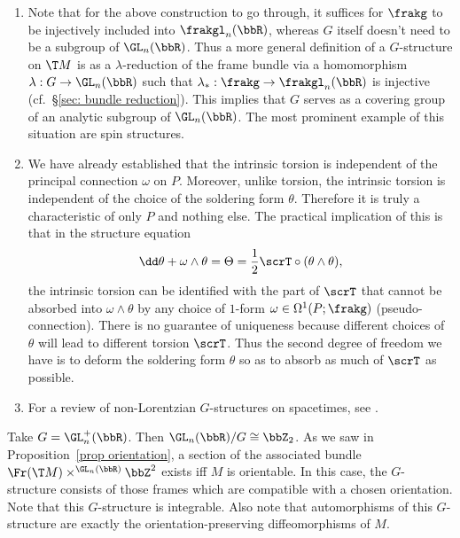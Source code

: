 \begin{rem}
    \begin{enumerate}
        \item Note that for the above construction to go through, it suffices for $\frakg$ to be injectively included into $\frakgl_n(\bbR)$, whereas $G$ itself doesn't need to be a subgroup of $\GL_n(\bbR)$. Thus a more general definition of a $G$-structure on $\T M$ is as a $\lambda$-reduction of the frame bundle via a homomorphism $\lambda:G\to \GL_n(\bbR)$ such that $\lambda_\ast:\frakg\to \frakgl_n(\bbR)$ is injective (cf.\ \S\ref{sec: bundle reduction}). This implies that $G$ serves as a covering group of an analytic subgroup of $\GL_n(\bbR)$. The most prominent example of this situation are spin structures.
        \item We have already established that the intrinsic torsion is independent of the principal connection $\omega$ on $P$. Moreover, unlike torsion, the intrinsic torsion is independent of the choice of the soldering form $\theta$. Therefore it is truly a characteristic of only $P$ and nothing else. The practical implication of this is that in the structure equation 
        \[\dd \theta+\omega\wedge\theta=\Theta=\frac12\scrT\circ (\theta\wedge\theta),\]
        the intrinsic torsion can be identified with the part of $\scrT$ that cannot be absorbed into $\omega\wedge\theta$ by any choice of $1$-form $\omega\in\Omega^1(P;\frakg)$ (pseudo-connection). There is no guarantee of uniqueness because different choices of $\theta$ will lead to different torsion $\scrT$. Thus the second degree of freedom we have is to deform the soldering form $\theta$ so as to absorb as much of $\scrT$ as possible. 
        \item For a review of non-Lorentzian $G$-structures on spacetimes, see \cite{OFarrill}.
    \end{enumerate}
\end{rem}


\begin{example}[Orientation]
    Take $G=\GL_n^+(\bbR)$. Then $\GL_n(\bbR)\slash G\cong \bbZ_2$. As we saw in Proposition~\ref{prop orientation}, a section of the associated bundle $\Fr(\T M)\times^{\GL_n(\bbR)}\bbZ^2$ exists iff $M$ is orientable. In this case, the $G$-structure consists of those frames which are compatible with a chosen orientation. Note that this $G$-structure is integrable. Also note that automorphisms of this $G$-structure are exactly the orientation-preserving diffeomorphisms of $M$.
\end{example}

